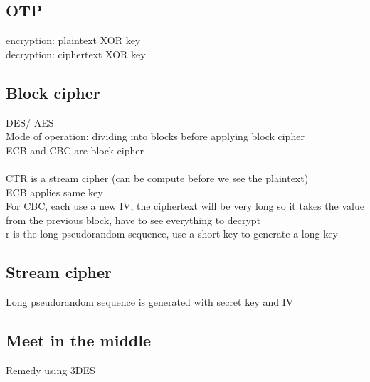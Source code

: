 \documentclass[11pt]{article}
\begin{document}
\begin{multicols*}{3}
\subsection*{OTP}
encryption: plaintext XOR key\\
decryption: ciphertext XOR key
\subsection*{Block cipher}
DES/ AES \\
Mode of operation: dividing into blocks before applying block cipher\\
ECB and CBC are block cipher\\\\
CTR is a stream cipher (can be compute before we see the plaintext)\\
ECB applies same key\\
For CBC, each use a new IV, the ciphertext will be very long so it takes the value from the previous block, have to see everything to decrypt\\
r is the long pseudorandom sequence, use a short key to generate a long key
\subsection*{Stream cipher}
Long pseudorandom sequence is generated with secret key and IV
\subsection*{Meet in the middle}
Remedy using 3DES
\end{multicols*}
\end{document}
